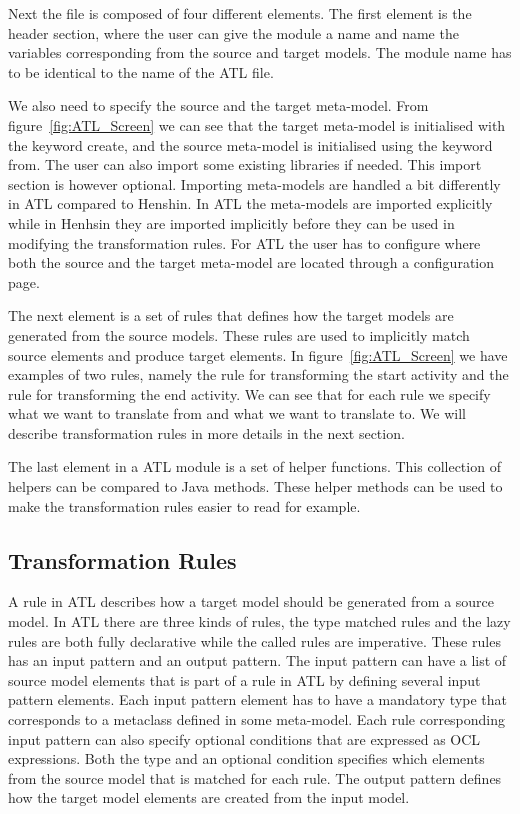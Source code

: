 Next the file is composed of four different elements. The first element is the
header section, where the user can give the module a name and name the variables
corresponding from the source and target models. The module name has to be
identical to the name of the ATL file.

We also need to specify the source and the target meta-model. From
figure~\ref{fig:ATL_Screen} we can see that the target meta-model is initialised 
with the keyword create, and the source meta-model is initialised using the
keyword from. The user can also import some existing libraries if needed. This
import section is however optional. Importing meta-models are handled a bit
differently in ATL compared to Henshin. In ATL the meta-models are imported
explicitly while in Henhsin they are imported implicitly before they can be used
in modifying the transformation rules. For ATL the user has to configure where
both the source and the target meta-model are located through a configuration
page. 

The next element is a set of rules that defines how the target models are
generated from the source models. These rules are used to implicitly match
source elements and produce target elements. In figure~\ref{fig:ATL_Screen} we
have examples of two rules, namely the rule for transforming the start activity
and the rule for transforming the end activity. We can see that for each rule we
specify what we want to translate from and what we want to translate to. We will
describe transformation rules in more details in the next section.

The last element in a ATL module is a set of helper functions. This collection
of helpers can be compared to Java methods. These helper methods can be used to
make the transformation rules easier to read for example.

\subsection{Transformation Rules}

A rule in ATL describes how a target model should be generated from a source
model. In ATL there are three kinds of rules, the type matched rules and the
lazy rules are both fully declarative while the called rules are imperative.
These rules has an input pattern and an output pattern. The input pattern can
have a list of source model elements that is part of a rule in ATL by defining
several input pattern elements. Each input pattern element has to have a
mandatory type that corresponds to a metaclass defined in some meta-model. Each
rule corresponding input pattern can also specify optional conditions that are
expressed as OCL expressions. Both the type and an optional condition specifies
which elements from the source model that is matched for each rule. The output
pattern defines how the target model elements are created from the input model. 

